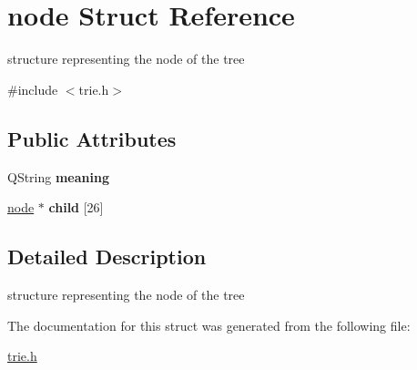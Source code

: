 \hypertarget{structnode}{}\section{node Struct Reference}
\label{structnode}


structure representing the node of the tree  




{\ttfamily \#include $<$trie.\+h$>$}

\subsection*{Public Attributes}
\begin{DoxyCompactItemize}
\item 
\mbox{\label{structnode_ad1be57a138f0b0d462e1eec01da16d88}} 
Q\+String {\bfseries meaning}
\item 
\mbox{\label{structnode_abb4596283433e9f407133c773dfb6bcc}} 
\hyperlink{structnode}{node} $\ast$ {\bfseries child} \mbox{[}26\mbox{]}
\end{DoxyCompactItemize}


\subsection{Detailed Description}
structure representing the node of the tree 

The documentation for this struct was generated from the following file\+:\begin{DoxyCompactItemize}
\item 
\hyperlink{trie_8h}{trie.\+h}\end{DoxyCompactItemize}
